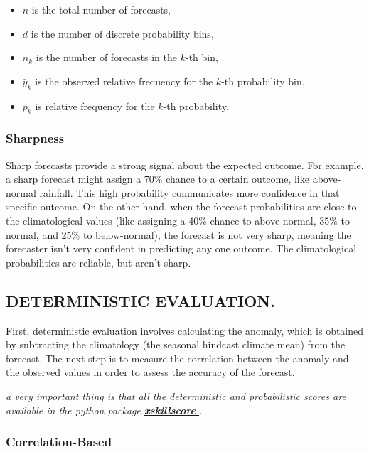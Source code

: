 \documentclass[11pt]{article}
\begin{document}
\begin{itemize}
    \item $n$ is the total number of forecasts,
    \item $d$ is the number of discrete probability bins,
    \item $n_k$ is the number of forecasts in the $k$-th bin,
    \item $\bar{y}_k$ is the observed relative frequency for the $k$-th probability bin,
    \item $\bar{p}_k$ is relative frequency for the $k$-th probability.
\end{itemize}


		\subsubsection{Sharpness}
Sharp forecasts provide a strong signal about the expected outcome. For example, a sharp forecast might assign a 70\% chance to a certain outcome, like above-normal rainfall. This high probability communicates more confidence in that specific outcome.
On the other hand, when the forecast probabilities are close to the climatological values (like assigning a 40\% chance to above-normal, 35\% to normal, and 25\% to below-normal), the forecast is not very sharp, meaning the forecaster isn't very confident in predicting any one outcome.
The climatological probabilities are reliable, but aren’t sharp.

	\subsection{DETERMINISTIC EVALUATION.}
	First, deterministic evaluation involves calculating the anomaly, which is obtained by subtracting the climatology (the seasonal hindcast climate mean) from the forecast. The next step is to measure the correlation between the anomaly and the observed values in order to assess the accuracy of the forecast. 
	
	
	\textit{	a very important thing is that all the deterministic and probabilistic scores are available in the python package \hyperlink{https://xskillscore.readthedocs.io/en/stable/quick-start.html}{\textbf{xskillscore} }.}
	
	\subsubsection{Correlation-Based}
	
\end{document}
